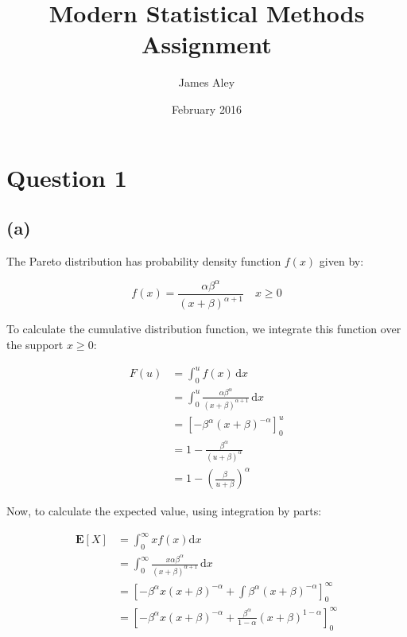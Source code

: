 \documentclass{article}
\title{Modern Statistical Methods Assignment}
\author{James Aley}
\date{February 2016}
\begin{document}
\maketitle

\section{Question 1}

\subsection{(a)}

The Pareto distribution has probability density function $f(x)$ given by:

\begin{displaymath}
  f(x) = \frac{\alpha \beta^{\alpha}}{{(x + \beta)}^{\alpha + 1}} \quad x \geq 0
\end{displaymath}

To calculate the cumulative distribution function, we integrate this
function over the support \(x \geq 0\):


\begin{align*}
  F(u) &= \int_0^u f(x) \, \mathrm{d}x \\
       &= \int_0^u \frac{\alpha \beta^{\alpha}}
                            {{(x + \beta)}^{\alpha + 1}}
         \, \mathrm{d}x \\
       &= {\left[ - \beta^\alpha {(x + \beta)}^{-\alpha}  \right]}_0^u \\
       &= 1 - \frac{\beta^{\alpha}}{{(u + \beta)}^\alpha} \\
       &= 1 - {\left( \frac{\beta}{u + \beta} \right)}^{\alpha}
\end{align*}

Now, to calculate the expected value, using integration by parts:

\begin{align*}
  \mathbf{E}\left[X\right] &= \int_0^{\infty} x f(x) \mathrm{d}x \\
                           &= \int_0^{\infty} \frac{x \alpha \beta^{\alpha}}
                             {{(x + \beta)}^{\alpha + 1}}
                             \, \mathrm{d}x \\
                           &= {\left[
                             - \beta^\alpha x {(x + \beta)}^{-\alpha}
                             + \int \beta^{\alpha} {(x + \beta)}^{- \alpha}
                             \right]}_0^{\infty} \\
                           &= {\left[
                             - \beta^\alpha x {(x + \beta)}^{-\alpha}
                             + \frac{\beta^{\alpha}}{1 - \alpha}
                             {\left( x + \beta \right)}^{1 - \alpha}
                             \right]}_0^{\infty} \\
\end{align*}
\end{document}
